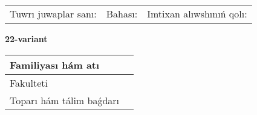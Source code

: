 \documentclass{article}
\begin{document}
\vspace{1cm}

\begin{tabular}{lll}
Tuwrı juwaplar sanı: \underline{\hspace{1.5cm}} & 
Bahası: \underline{\hspace{1.5cm}} & 
Imtixan alıwshınıń qolı: \underline{\hspace{2cm}} \\
\end{tabular}

\egroup

\newpage


\textbf{22-variant}\\

\bgroup
\def\arraystretch{1.6} %

\begin{tabular}{|m{5.7cm}|m{9.5cm}|}
\hline
Familiyası hám atı & \\
\hline
Fakulteti  & \\
\hline
Toparı hám tálim baǵdarı  & \\
\hline
\end{tabular}

\vspace{1cm}
\end{document}
